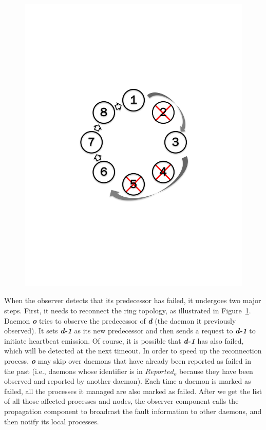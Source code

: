 \documentclass[5p,times,twocolumn]{elsarticle}
\begin{document}
\begin{figure}[h]
\begin{minipage}[t]{.22\textwidth}
  \includegraphics[trim=3cm 8.0cm 3cm 8cm,width=\linewidth]{reconnet_cross.pdf}\vspace{-1em}
  \label{fig:ReconnectRing}
\end{minipage}
\end{figure}

When the observer detects that its predecessor has failed, it undergoes two major steps.
First, it needs to reconnect the ring topology, as illustrated in Figure~\ref{fig:ReconnectRing}. Daemon \textbf{\textit{o}} tries to
observe the predecessor of \textbf{\textit{d}} (the daemon it previously observed).
It sets \textbf{\textit{d-1}} as its new predecessor and then sends a request to \textbf{\textit{d-1}} to initiate heartbeat emission. Of course,
it is possible that \textbf{\textit{d-1}} has also failed, which will be detected at the next timeout. In order
to speed up the reconnection process, \textbf{\textit{o}} may skip over
daemons that have already been reported as failed in the past (i.e., daemons
whose identifier is in $Reported_o$ because they have been observed and reported
by another daemon). Each time a daemon is marked as failed, all the processes it
managed are also marked as failed. After we get the list of all those affected processes and nodes, the observer component calls the propagation component to broadcast the fault information to other daemons, and then notify its local processes.
\end{document}
